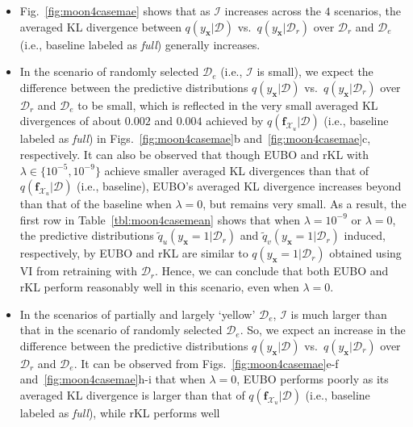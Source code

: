 \documentclass{article}
\theoremstyle{definition}
\newcommand{\mbf}[1]{\mathbf{#1}}
\newcommand{\mcl}[1]{\mathcal{#1}}
\newcommand{\da}{\mcl{D}}
\newcommand{\dc}{\mcl{D}_r}
\newcommand{\dr}{\mcl{D}_e}
\newcommand{\eubo}{\tilde{q}_u}
\newcommand{\elbo}{\tilde{q}_v}
\begin{document}
\begin{itemize}
    \item Fig.~\ref{fig:moon4casemae} shows that as $\mcl{I}$ increases across the $4$ scenarios, the averaged KL divergence between  $q(y_{\mbf{x}}|\da)$ vs.~$q(y_{\mbf{x}}|\dc)$ over $\dc$ and $\dr$ 
    (i.e., baseline labeled as \emph{full}) generally increases.
    
    \item In the scenario of randomly selected $\dr$ (i.e., $\mcl{I}$ is small), we expect the difference between the predictive distributions $q(y_{\mbf{x}}|\da)$ vs.~$q(y_{\mbf{x}}|\dc)$ over $\dc$ and $\dr$
    to be small, which is reflected in the very small averaged KL divergences of about $0.002$ and $0.004$  achieved by $q(\mbf{f}_{\mcl{X}_u}|\da)$ (i.e., baseline labeled as \emph{full}) in Figs.~\ref{fig:moon4casemae}b and~\ref{fig:moon4casemae}c, respectively. 
    It can also be observed that though  EUBO and rKL with $\lambda \in \{10^{-5}, 10^{-9}\}$ achieve smaller averaged KL divergences than that of $q(\mbf{f}_{\mcl{X}_u}|\da)$ (i.e., baseline), 
    EUBO's averaged KL divergence increases beyond than that of the baseline when $\lambda = 0$, but remains very small. 
    As a result, the first row in Table~\ref{tbl:moon4casemean} shows that when $\lambda = 10^{-9}$ or $\lambda = 0$, the predictive distributions $\eubo(y_{\mbf{x}}=1|\dc)$ and $\elbo(y_{\mbf{x}}=1|\dc)$ induced, respectively, by EUBO and rKL are similar to $q(y_{\mbf{x}}=1|\dc)$ obtained using VI from retraining with $\dc$. Hence, we can conclude that both EUBO and rKL perform reasonably well in this scenario, even when $\lambda = 0$.
    \item In the scenarios of partially and largely `yellow' $\dr$, $\mcl{I}$ is much larger than that in the scenario of randomly selected $\dr$. So, we expect an increase in the difference between the predictive distributions $q(y_{\mbf{x}}|\da)$ vs.~$q(y_{\mbf{x}}|\dc)$ over $\dc$ and $\dr$.
    It can be observed from Figs.~\ref{fig:moon4casemae}e-f and~\ref{fig:moon4casemae}h-i that when $\lambda = 0$, EUBO performs poorly as its averaged KL divergence is larger than that of $q(\mbf{f}_{\mcl{X}_u}|\da)$ (i.e., baseline labeled as \emph{full}), while rKL performs  well 

\end{itemize}
\end{document}
